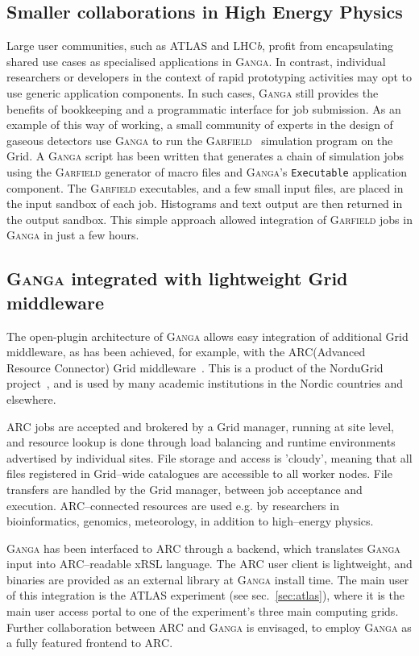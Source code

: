 \documentclass{elsart}
\def\lhcb {LHC{\em b\/}\xspace}
\def\atlas {ATLAS\xspace}
\def\ganga {\textsc{Ganga}\xspace}
\def\garfield {\textsc{Garfield}\xspace}
\def\grid {Grid\xspace}
\def\ARC{ARC\xspace}
\newcommand{\code}[1]{\texttt{#1}}
\newcommand{\qq}[1]{#1}
\begin{document}
\begin{linenumbers}
\subsection{Smaller collaborations in High Energy Physics}
\label{sec:smallHEP}
Large user communities, such as \atlas and \lhcb, profit from encapsulating
shared use cases as specialised applications in \ganga. In contrast,
individual researchers or developers in the context of rapid prototyping
activities may opt to use generic application components.
In such cases, \ganga still provides the benefits of
bookkeeping and a programmatic interface for job submission. As an example of
this way of working, a small
community of experts in the design of gaseous detectors
use \ganga to run the \garfield~\cite{Garfield} simulation program on the
\grid.  A \ganga script has been written that generates a chain of
simulation jobs
using the \garfield generator of macro files and \ganga's \code{Executable}
application component.  The \garfield executables, and a few small input files,
are placed in
the input sandbox of each job. Histograms and text output are then returned
in the
output sandbox. This simple approach allowed integration of
\garfield jobs in \ganga in just a few hours.

\subsection{\ganga integrated with lightweight \grid middleware}


\qq{
The open-plugin architecture of \ganga allows easy integration of
additional \grid middleware, as has been achieved, for example, with the
\ARC (Advanced Resource Connector) \grid middleware~\cite{ellert_2007}.  This is a
product of the NorduGrid project~\cite{ellert_2003}, and is used by many academic
institutions in the Nordic countries and elsewhere.
}

\ARC jobs are accepted and brokered by a \grid manager, running at site level, and resource
lookup is done through load balancing and runtime environments
advertised by individual sites. File storage and access is 'cloudy',
meaning that all files registered in \grid--wide catalogues are
accessible to all worker nodes. File transfers are handled by
the \grid manager, between job acceptance and
execution. \ARC--connected resources are used e.g. by researchers in
bioinformatics, genomics, meteorology, in addition to high--energy
physics.

\ganga has been interfaced to \ARC through a backend, which translates
\ganga input into \ARC--readable xRSL language. The \ARC user client is
lightweight, and binaries are provided as an external library at \ganga
install time. The main user of this integration is the \atlas
experiment (see sec.~\ref{sec:atlas}), where it is the main user
access portal to one of the experiment's three main computing
grids. Further collaboration between \ARC and \ganga is envisaged, to
employ \ganga as a fully featured frontend to \ARC.


\end{linenumbers}
\end{document}
